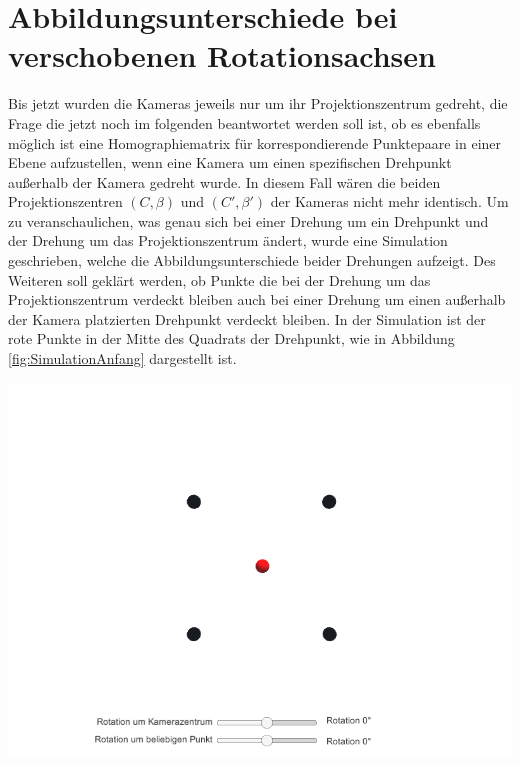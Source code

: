 \section{Abbildungsunterschiede bei verschobenen Rotationsachsen}


Bis jetzt wurden die Kameras jeweils nur um ihr Projektionszentrum gedreht, die Frage die jetzt noch im folgenden beantwortet werden soll ist, ob es ebenfalls möglich ist eine Homographiematrix für korrespondierende Punktepaare in einer Ebene aufzustellen, wenn eine Kamera um einen spezifischen Drehpunkt außerhalb der Kamera gedreht wurde. In diesem Fall wären die beiden Projektionszentren $(C,\beta)$ und $(C',\beta')$ der Kameras nicht mehr identisch. Um zu veranschaulichen, was genau sich bei einer Drehung um ein Drehpunkt und der Drehung um das Projektionszentrum ändert, wurde eine Simulation geschrieben, welche die Abbildungsunterschiede beider Drehungen aufzeigt. Des Weiteren soll geklärt werden, ob Punkte die bei der Drehung um das Projektionszentrum verdeckt bleiben auch bei einer Drehung um einen außerhalb der Kamera platzierten Drehpunkt verdeckt bleiben. In der Simulation ist der rote Punkte in der Mitte des Quadrats der Drehpunkt, wie in Abbildung \ref{fig:SimulationAnfang} dargestellt ist. 

\begin{minipage}{\linewidth}
	\centering
	\includegraphics[width=.8\linewidth]{images/Ausgangslage.png}
	\label{fig:SimulationAnfang}
\end{minipage}\\


